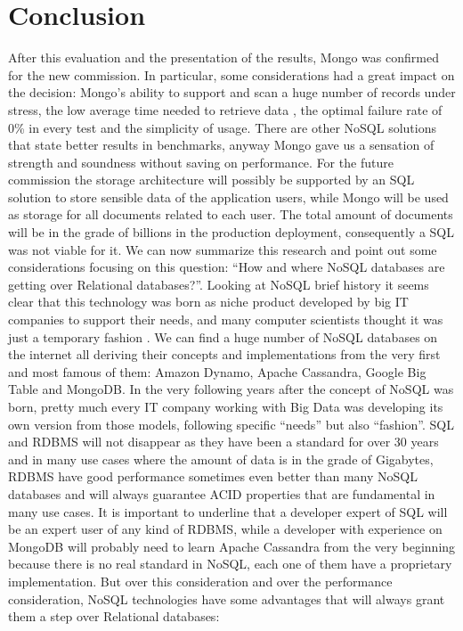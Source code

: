 \chapter{Conclusion}
\label{cha:conclusion}
After this evaluation and the presentation of the results, Mongo was confirmed for the new commission. In particular, some considerations had a great impact on the decision: Mongo's ability to support and scan a huge number of records under stress, the low average time needed to retrieve data , the optimal failure rate of 0\% in every test and the simplicity of usage.
There are other NoSQL solutions that state better results in benchmarks, anyway Mongo gave us a sensation of strength and soundness without saving on performance.
For the future commission the storage architecture will possibly be supported by an SQL solution to store sensible data of the application users, while Mongo will be used as storage for all documents related to each user. The total amount of documents will be in the grade of billions in the production deployment, consequently a SQL was not viable for it.
We can now summarize this research and point out some considerations focusing on this question: “How and where NoSQL databases are getting over Relational databases?”.
Looking at NoSQL brief history it seems clear that this technology was born as niche product developed by big IT companies to support their needs, and many computer scientists thought it was just a temporary fashion \cite{mohan}. We can find a huge number of NoSQL databases on the internet all deriving their concepts and implementations from the very first and most famous of them: Amazon Dynamo, Apache Cassandra, Google Big Table and MongoDB.
In the very following years after the concept of NoSQL was born, pretty much every IT company working with Big Data was developing its own version from those models, following specific “needs” but also “fashion”.
SQL and RDBMS will not disappear as they have been a standard for over 30 years and in many use cases where the amount of data is in the grade of Gigabytes, RDBMS  have good performance sometimes even better than many NoSQL databases and will always guarantee ACID properties that are fundamental in many use cases.
It is important to underline that a developer expert of SQL will be an expert user of any kind of RDBMS, while a developer with experience on MongoDB will probably need to learn Apache Cassandra from the very beginning because there is no real standard in NoSQL, each one of them have a proprietary implementation.
But over this consideration and over the performance consideration, NoSQL technologies have some advantages that will always grant them a step over Relational databases:
